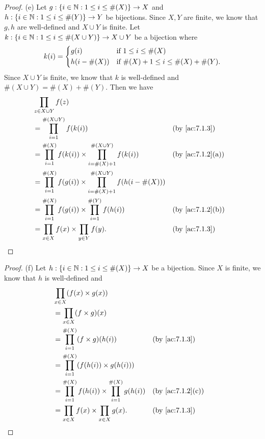 \begin{proof}{(e)}
  Let \(g : \left\lbrace i \in \mathbb{N} : 1 \leq i \leq \#(X)\right\rbrace \to X\) and \(h : \left\lbrace i \in \mathbb{N} : 1 \leq i \leq \#(Y)\right\rbrace \to Y\) be bijections.
  Since \(X, Y\) are finite, we know that \(g, h\) are well-defined and \(X \cup Y\) is finite.
  Let \(k : \left\lbrace i \in \mathbb{N} : 1 \leq i \leq \#(X \cup Y)\right\rbrace \to X \cup Y\) be a bijection where
  \[
    k(i) = \begin{dcases}
      g(i)         & \text{if } 1 \leq i \leq \#(X)                  \\
      h(i - \#(X)) & \text{if } \#(X) + 1 \leq i \leq \#(X) + \#(Y).
    \end{dcases}
  \]
  Since \(X \cup Y\) is finite, we know that \(k\) is well-defined and \(\#(X \cup Y) = \#(X) + \#(Y)\).
  Then we have
  \begin{align*}
     & \prod_{z \in X \cup Y} f(z)                                                                                                     \\
     & = \prod_{i = 1}^{\#(X \cup Y)} f(k(i))                                                      &  & \by{ac:7.1.3}                  \\
     & = \prod_{i = 1}^{\#(X)} f(k(i)) \times \prod_{i = \#(X) + 1}^{\#(X \cup Y)} f(k(i))         &  & \text{(by \cref{ac:7.1.2}(a))} \\
     & = \prod_{i = 1}^{\#(X)} f(g(i)) \times \prod_{i = \#(X) + 1}^{\#(X \cup Y)} f(h(i - \#(X)))                                     \\
     & = \prod_{i = 1}^{\#(X)} f(g(i)) \times \prod_{i = 1}^{\#(Y)} f(h(i))                        &  & \text{(by \cref{ac:7.1.2}(b))} \\
     & = \prod_{x \in X} f(x) \times \prod_{y \in Y} f(y).                                         &  & \by{ac:7.1.3}
  \end{align*}
\end{proof}

\begin{proof}{(f)}
  Let \(h : \left\lbrace i \in \mathbb{N} : 1 \leq i \leq \#(X)\right\rbrace \to X\) be a bijection.
  Since \(X\) is finite, we know that \(h\) is well-defined and
  \begin{align*}
     & \prod_{x \in X} (f(x) \times g(x))                                                                       \\
     & = \prod_{x \in X} (f \times g)(x)                                                                        \\
     & = \prod_{i = 1}^{\#(X)} (f \times g)(h(i))                           &  & \by{ac:7.1.3}                  \\
     & = \prod_{i = 1}^{\#(X)} (f(h(i)) \times g(h(i)))                                                         \\
     & = \prod_{i = 1}^{\#(X)} f(h(i)) \times \prod_{i = 1}^{\#(X)} g(h(i)) &  & \text{(by \cref{ac:7.1.2}(c))} \\
     & = \prod_{x \in X} f(x) \times \prod_{x \in X} g(x).                  &  & \by{ac:7.1.3}
  \end{align*}
\end{proof}


